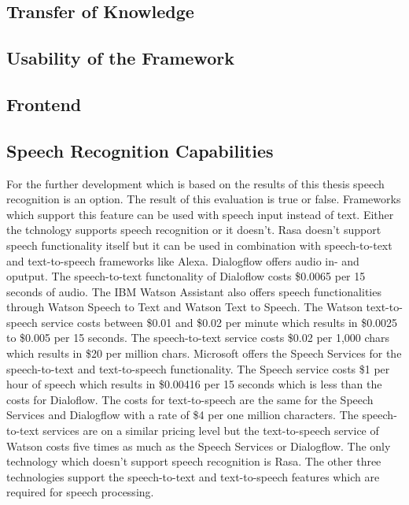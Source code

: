 \subsection*{Transfer of Knowledge}
\subsection*{Usability of the Framework}
\subsection*{Frontend}
\subsection*{Speech Recognition Capabilities}
For the further development which is based on the results of this thesis speech recognition 
is an option. 
The result of this evaluation is true or false.
Frameworks which support this feature can be used with speech input instead of text.
Either the tchnology supports speech recognition or it doesn't. 
Rasa doesn't support speech functionality itself but it can be used in combination with 
speech-to-text and text-to-speech frameworks like Alexa.
Dialogflow offers audio in- and oputput.
The speech-to-text functonality of Dialoflow costs \$0.0065 per 15 seconds of audio.
The IBM Watson Assistant also offers speech functionalities through Watson Speech to 
Text and Watson Text to Speech.
The Watson text-to-speech service costs between \$0.01 and \$0.02 per minute which results 
in \$0.0025 to \$0.005 per 15 seconds.
The speech-to-text service costs \$0.02 per 1,000 chars which results in 
\$20 per million chars.
Microsoft offers the Speech Services for the speech-to-text and text-to-speech functionality.
The Speech service costs \$1 per hour of speech which results in \$0.00416 per 15 seconds which is 
less than the costs for Dialoflow.
The costs for text-to-speech are the same for the Speech Services and Dialogflow with a 
rate of \$4 per one million characters.
The speech-to-text services are on a similar pricing level but the text-to-speech service of 
Watson costs five times as much as the Speech Services or Dialogflow.
The only technology which doesn't support speech recognition is Rasa.
The other three technologies support the speech-to-text and text-to-speech features 
which are required for speech processing.   




